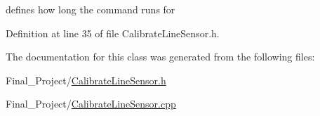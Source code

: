 defines how long the command runs for 



Definition at line 35 of file Calibrate\-Line\-Sensor.\-h.



The documentation for this class was generated from the following files\-:\begin{DoxyCompactItemize}
\item 
Final\-\_\-\-Project/\hyperlink{CalibrateLineSensor_8h}{Calibrate\-Line\-Sensor.\-h}\item 
Final\-\_\-\-Project/\hyperlink{CalibrateLineSensor_8cpp}{Calibrate\-Line\-Sensor.\-cpp}\end{DoxyCompactItemize}
